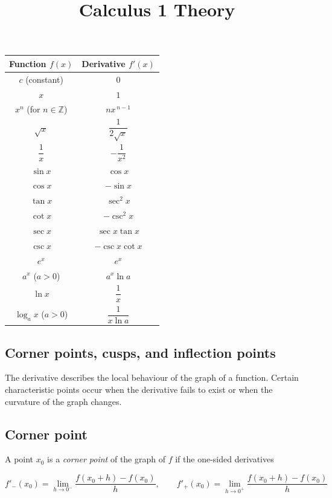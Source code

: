 \documentclass[11pt,a4paper]{article} \usepackage[T1]{fontenc}
\theoremstyle{plain} \newtheorem{theorem}{Theorem} \title{Calculus 1 Theory}
\begin{document}
\begin{center}
\renewcommand{\arraystretch}{1.4}

\begin{tabular}
{|c|c|} \hline \textbf{Function $f(x)$} & \textbf{Derivative $f'(x)$} \\ \hline $c$ (constant) & $0$ \\ \hline $x$ & $1$ \\ \hline $x^n$ (for $n\in\mathbb{Z}$) & $n x^{\,n-1}$ \\ \hline $\sqrt{x}$ & $\dfrac{1}{2\sqrt{x}}$ \\ \hline $\dfrac{1}{x}$ & $-\dfrac{1}{x^2}$ \\ \hline $\sin x$ & $\cos x$ \\ \hline $\cos x$ & $-\sin x$ \\ \hline $\tan x$ & $\sec^2 x$ \\ \hline $\cot x$ & $-\csc^2 x$ \\ \hline $\sec x$ & $\sec x \tan x$ \\ \hline $\csc x$ & $-\csc x \cot x$ \\ \hline $e^x$ & $e^x$ \\ \hline $a^x$ ($a>0$) & $a^x \ln a$ \\ \hline $\ln x$ & $\dfrac{1}{x}$ \\ \hline $\log_a x$ ($a>0$) & $\dfrac{1}{x \ln a}$ \\ \hline
\end{tabular}

\end{center}

\subsection {Corner points, cusps, and inflection points}

The derivative describes the local behaviour of the graph of a function.
Certain characteristic points occur when the derivative fails to exist or when
the curvature of the graph changes.

\subsection*{Corner point}

A point $x_0$ is a \emph{corner point} of the graph of $f$ if the one-sided
derivatives

\[
f'_-(x_0) = \lim_{h\to 0^-} \frac{f(x_0+h)-f(x_0)}{h}, \qquad f'_+(x_0) = \lim_{h\to 0^+} \frac{f(x_0+h)-f(x_0)}{h}
\]
\end{document}
